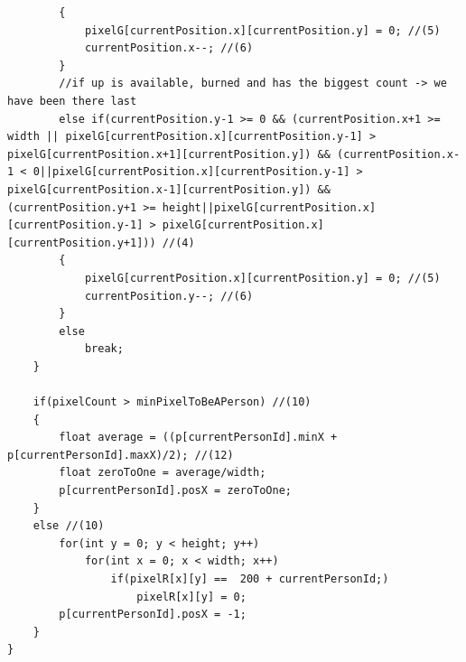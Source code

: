 \begin{lstlisting}
		{
			pixelG[currentPosition.x][currentPosition.y] = 0; //(5)
			currentPosition.x--; //(6)
		}
		//if up is available, burned and has the biggest count -> we have been there last
		else if(currentPosition.y-1 >= 0 && (currentPosition.x+1 >= width || pixelG[currentPosition.x][currentPosition.y-1] > pixelG[currentPosition.x+1][currentPosition.y]) && (currentPosition.x-1 < 0||pixelG[currentPosition.x][currentPosition.y-1] > pixelG[currentPosition.x-1][currentPosition.y]) && (currentPosition.y+1 >= height||pixelG[currentPosition.x][currentPosition.y-1] > pixelG[currentPosition.x][currentPosition.y+1])) //(4)
		{
			pixelG[currentPosition.x][currentPosition.y] = 0; //(5)
			currentPosition.y--; //(6)
		}
		else
			break;
	}
	
	if(pixelCount > minPixelToBeAPerson) //(10)
	{
		float average = ((p[currentPersonId].minX + p[currentPersonId].maxX)/2); //(12)
		float zeroToOne = average/width;
		p[currentPersonId].posX = zeroToOne;
	}
	else //(10)
		for(int y = 0; y < height; y++)
			for(int x = 0; x < width; x++)
				if(pixelR[x][y] ==  200 + currentPersonId;)
					pixelR[x][y] = 0;
		p[currentPersonId].posX = -1;
	}
}
\end{lstlisting}
